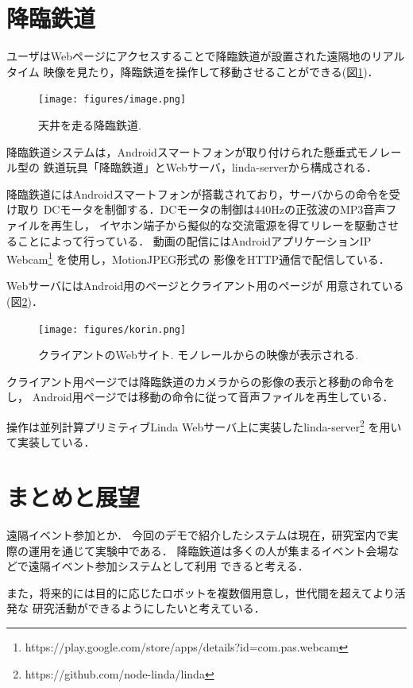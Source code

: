 \documentclass[submit,techreq]{ipsj}
\begin{document}
\section{降臨鉄道}

ユーザはWebページにアクセスすることで降臨鉄道が設置された遠隔地のリアルタイム
映像を見たり，降臨鉄道を操作して移動させることができる(図\ref{monorail})．

\begin{figure}[H]
\begin{center}
\texttt{[image: figures/image.png]}
\end{center}
\caption{天井を走る降臨鉄道.}
\label{monorail}
\end{figure}


降臨鉄道システムは，Androidスマートフォンが取り付けられた懸垂式モノレール型の
鉄道玩具「降臨鉄道」とWebサーバ，linda-serverから構成される．

降臨鉄道にはAndroidスマートフォンが搭載されており，サーバからの命令を受け取り
DCモータを制御する．DCモータの制御は440Hzの正弦波のMP3音声ファイルを再生し，
イヤホン端子から擬似的な交流電源を得てリレーを駆動させることによって行っている．
動画の配信にはAndroidアプリケーションIP Webcam\footnote{
  \textsf{https://play.google.com/store/apps/details?id=com.pas.webcam}
}
を使用し，MotionJPEG形式の
影像をHTTP通信で配信している．

WebサーバにはAndroid用のページとクライアント用のページが
用意されている(図\ref{browser})．

\begin{figure}[H]
\begin{center}
\texttt{[image: figures/korin.png]}
\end{center}
\caption{クライアントのWebサイト. モノレールからの映像が表示される.}
\label{browser}
\end{figure}

クライアント用ページでは降臨鉄道のカメラからの影像の表示と移動の命令をし，
Android用ページでは移動の命令に従って音声ファイルを再生している．

操作は並列計算プリミティブLinda\cite{Carriero:1989:LC:63334.63337}
Webサーバ上に実装したlinda-server\footnote{
  \textsf{https://github.com/node-linda/linda}
}
を用いて実装している．

\section{まとめと展望}

遠隔イベント参加とか．
今回のデモで紹介したシステムは現在，研究室内で実際の運用を通じて実験中である．
降臨鉄道は多くの人が集まるイベント会場などで遠隔イベント参加システムとして利用
できると考える．

また，将来的には目的に応じたロボットを複数個用意し，世代間を超えてより活発な
研究活動ができるようにしたいと考えている．




\end{document}
